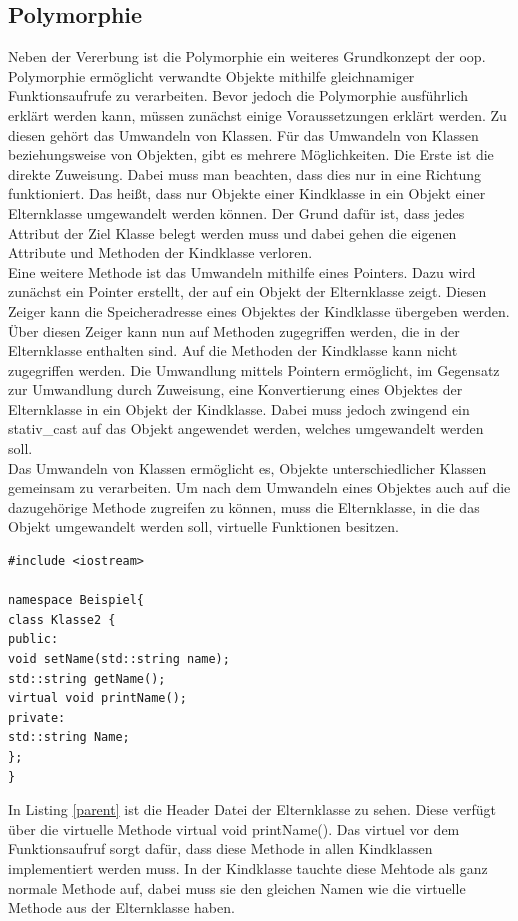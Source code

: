 \subsection{Polymorphie}\label{poly}
Neben der Vererbung ist die Polymorphie ein weiteres Grundkonzept der \ac{oop}. Polymorphie ermöglicht verwandte Objekte mithilfe gleichnamiger Funktionsaufrufe zu verarbeiten. Bevor jedoch die Polymorphie ausführlich erklärt werden kann, müssen zunächst einige Voraussetzungen erklärt werden.
Zu diesen gehört das Umwandeln von Klassen. Für das Umwandeln von  Klassen beziehungsweise von Objekten, gibt es mehrere Möglichkeiten. Die Erste ist die direkte Zuweisung. Dabei muss man beachten, dass dies nur in eine Richtung funktioniert. Das heißt, dass nur Objekte einer Kindklasse in ein Objekt einer Elternklasse umgewandelt werden können. Der Grund dafür ist, dass jedes Attribut der Ziel Klasse belegt werden muss und dabei gehen die eigenen  Attribute und Methoden  der Kindklasse verloren.\\
Eine weitere Methode ist das Umwandeln mithilfe eines Pointers.
Dazu wird zunächst ein Pointer erstellt, der auf ein Objekt der Elternklasse zeigt. Diesen Zeiger kann die Speicheradresse eines Objektes der Kindklasse übergeben werden. Über diesen Zeiger kann nun auf Methoden zugegriffen werden, die in der Elternklasse enthalten sind. Auf die Methoden der Kindklasse kann nicht zugegriffen werden. Die Umwandlung mittels Pointern ermöglicht, im Gegensatz zur Umwandlung durch Zuweisung, eine Konvertierung eines Objektes der Elternklasse in ein Objekt der Kindklasse. Dabei muss jedoch zwingend ein \glqq stativ\_cast\grqq{} auf das Objekt angewendet werden, welches umgewandelt werden soll. \\
Das Umwandeln von Klassen ermöglicht es, Objekte unterschiedlicher Klassen gemeinsam zu verarbeiten. 
Um nach dem Umwandeln eines Objektes auch auf die dazugehörige Methode zugreifen zu können, muss die Elternklasse, in die das Objekt umgewandelt werden soll, virtuelle Funktionen besitzen. 
\newpage
\begin{lstlisting}[caption = Klasse2.h,label=parent]
#include <iostream>

namespace Beispiel{
class Klasse2 {
public:
void setName(std::string name);
std::string getName();
virtual void printName();
private:
std::string Name;
};
}
	\end{lstlisting}
In Listing  \ref{parent} ist die Header Datei der Elternklasse zu sehen. Diese verfügt über die virtuelle Methode \glqq virtual void printName()\grqq{}. Das 
\glqq virtuel\grqq{} vor dem Funktionsaufruf sorgt dafür, dass diese Methode in allen Kindklassen implementiert werden muss. In der Kindklasse tauchte diese Mehtode als ganz normale Methode auf, dabei muss sie den gleichen Namen wie die virtuelle Methode aus der Elternklasse haben.\\
